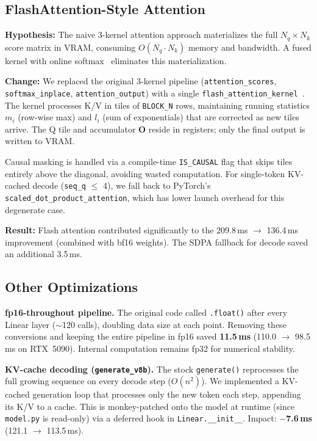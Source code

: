 \documentclass{article}
\begin{document}
\subsection{FlashAttention-Style Attention}

\textbf{Hypothesis:} The naive 3-kernel attention approach materializes the full $N_q \times N_k$ score matrix in VRAM, consuming $O(N_q \cdot N_k)$ memory and bandwidth.  A fused kernel with online softmax~\citep{milakov2018online} eliminates this materialization.

\textbf{Change:} We replaced the original 3-kernel pipeline (\texttt{attention\_scores}, \texttt{softmax\_inplace}, \texttt{attention\_output}) with a single \texttt{flash\_attention\_kernel}~\citep{dao2023flashattention2fasterattentionbetter, ringlein2025anatomy}.  The kernel processes K/V in tiles of \texttt{BLOCK\_N} rows, maintaining running statistics $m_i$ (row-wise max) and $l_i$ (sum of exponentials) that are corrected as new tiles arrive.  The Q tile and accumulator $\mathbf{O}$ reside in registers; only the final output is written to VRAM.

Causal masking is handled via a compile-time \texttt{IS\_CAUSAL} flag that skips tiles entirely above the diagonal, avoiding wasted computation.  For single-token KV-cached decode (\texttt{seq\_q} $\leq$ 4), we fall back to PyTorch's \texttt{scaled\_dot\_product\_attention}, which has lower launch overhead for this degenerate case.

\textbf{Result:} Flash attention contributed significantly to the 209.8\,ms $\to$ 136.4\,ms improvement (combined with bf16 weights).  The SDPA fallback for decode saved an additional 3.5\,ms.

\subsection{Other Optimizations}

\textbf{fp16-throughout pipeline.}
The original code called \texttt{.float()} after every Linear layer ($\sim$120 calls), doubling data size at each point.  Removing these conversions and keeping the entire pipeline in fp16 saved \textbf{11.5\,ms} (110.0 $\to$ 98.5\,ms on RTX~5090).  Internal computation remains fp32 for numerical stability.

\textbf{KV-cache decoding (\texttt{generate\_v8b}).}
The stock \texttt{generate()} reprocesses the full growing sequence on every decode step ($O(n^2)$).  We implemented a KV-cached generation loop that processes only the new token each step, appending its K/V to a cache.  This is monkey-patched onto the model at runtime (since \texttt{model.py} is read-only) via a deferred hook in \texttt{Linear.\_\_init\_\_}.  Impact: \textbf{$-$7.6\,ms} (121.1 $\to$ 113.5\,ms).
\end{document}
